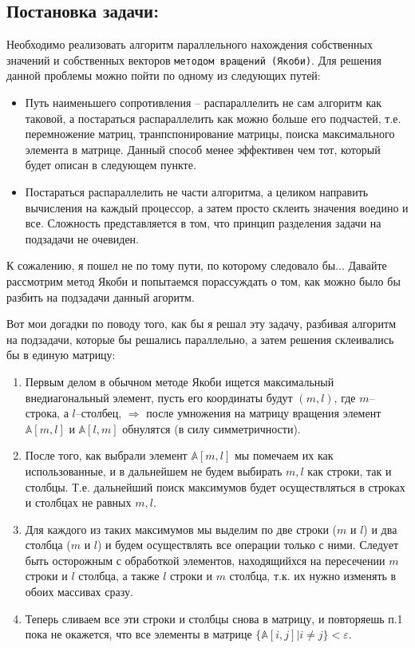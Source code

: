 \documentclass[utf8, 12pt, a4paper, oneside]{article}
\begin{document}

\subsection*{Постановка задачи:}
\parindent=1cm Необходимо реализовать алгоритм параллельного нахождения собственных значений и собственных векторов {\tt{методом вращений (Якоби)}}. Для решения данной проблемы можно пойти по одному из следующих путей:
\begin{itemize}
\item Путь наименьшего сопротивления -- распараллелить не сам алгоритм как таковой, а постараться распараллелить как можно больше его подчастей, т.е. перемножение матриц, транпспонирование матрицы, поиска максимального элемента в матрице. Данный способ менее эффективен чем тот, который будет описан в следующем пункте.
\item Постараться распараллелить не части алгоритма, а целиком направить вычисления на каждый процессор, а затем просто склеить значения воедино и все. Сложность представляется в том, что принцип разделения задачи на подзадачи не очевиден.
\end{itemize}

К сожалению, я пошел не по тому пути, по которому следовало бы... Давайте рассмотрим метод Якоби и попытаемся порассуждать о том, как можно было бы разбить на подзадачи данный агоритм.



Вот мои догадки по поводу того, как бы я решал эту задачу, разбивая алгоритм на подзадачи, которые бы решались параллельно, а затем решения склеивались бы в единую матрицу:
\begin{enumerate}
\item Первым делом в обычном методе Якоби ищется максимальный внедиагональный элемент, пусть его координаты будут $(m, l)$, где $m$--строка, а $l$--столбец, $\Rightarrow$ после умножения на матрицу вращения элемент $\mathbb{A}[m,l]$ и $\mathbb{A}[l,m]$ обнулятся (в силу симметричности).
\item После того, как выбрали элемент $\mathbb{A}[m,l]$ мы помечаем их как использованные, и в дальнейшем не будем выбирать ${m,l}$ как строки, так и столбцы. Т.е. дальнейший поиск максимумов будет осуществляться в строках и столбцах не равных ${m,l}$.
\item Для каждого из таких максимумов мы выделим по две строки ($m$ и $l$) и два столбца ($m$ и $l$) и будем осуществлять все операции только с ними. Следует быть осторожным с обработкой элементов, находящийхся на пересечении $m$ строки и $l$ столбца, а также $l$ строки и $m$ столбца, т.к. их нужно изменять в обоих массивах сразу.
\item Теперь сливаем все эти строки и столбцы снова в матрицу, и повторяешь п.1 пока не окажется, что все элементы в матрице $\{\mathbb{A}[i,j] | i \neq j\}  < \varepsilon$.
\end{enumerate}
\end{document}
